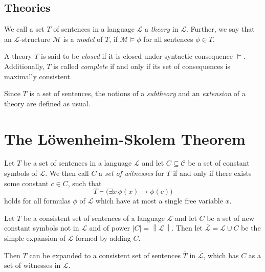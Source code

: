 \documentclass[../../main.tex]{subfiles}
\begin{document}

\subsection{Theories}
\begin{definition}[Theory]\cite[\S.1.2]{Mar02}\cite[\S 1.4]{Cha90}
    We call a set $T$ of sentences in a language $\mathcal{L}$ a \emph{theory} in $\mathcal{L}$.
    Further, we say that an $\mathcal{L}$-structure $\mathcal{M}$ is a \emph{model} of $T$,
    if $\mathcal{M} \models \phi$ for all sentences $\phi \in T$.

    A theory $T$ is said to be \emph{closed} if it is closed under syntactic consequence $\models$.
    Additionally, $T$ is called \emph{complete} if and only if its set of consequences is maximally consistent.

    Since $T$ is a set of sentences, the notions of a \emph{subtheory} and an \emph{extension} of a theory are defined as usual.
\end{definition}

\section{The Löwenheim-Skolem Theorem}

\begin{definition}
    Let $T$ be a set of sentences in a language $\mathcal{L}$ and let $C \subseteq \mathcal{C}$ be a set of constant symbols of $\mathcal{L}$.
    We then call $C$ a \emph{set of witnesses} for $T$ if and only if there exists some constant $c \in C$, such that
    $$T \vdash \big(\exists x \, \phi(x) \rightarrow \phi(c)\big)$$
    holds for all formulas $\phi$ of $\mathcal{L}$ which have at most a single free variable $x$.
\end{definition}

\begin{lemma}\cite[Lemma 2.1.1]{Cha90}
    Let $T$ be a consistent set of sentences of a language $\mathcal{L}$ and   
    let $C$ be a set of new constant symbols not in $\mathcal{L}$ and of power $\left\lvert C \right\rvert = \left\lVert \mathcal{L} \right\rVert$.
    Then let $\overline{\mathcal{L}} = \mathcal{L} \cup C$ be the simple expansion of $\mathcal{L}$ formed by adding $C$.
    
    Then $T$ can be expanded to a consistent set of sentences $\bar{T}$ in $\overline{\mathcal{L}}$, which has $C$ as a set of witnesses in $\overline{\mathcal{L}}$.
\end{lemma}
\end{document}
